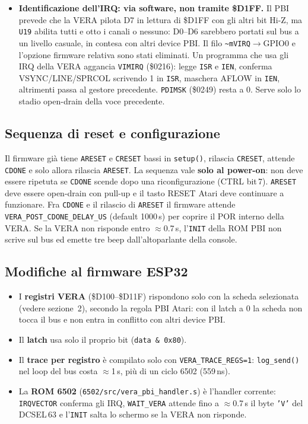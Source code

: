 \documentclass[12pt, a4paper]{article}
\begin{document}
\begin{itemize}
  \item \textbf{Identificazione dell'IRQ: via software, non tramite \$D1FF.} Il PBI prevede che la VERA pilota D7 in lettura di \$D1FF con gli altri bit Hi-Z, ma \texttt{U19} abilita tutti e otto i canali o nessuno: D0--D6 sarebbero portati sul bus a un livello casuale, in contesa con altri device PBI. Il filo \texttt{\textasciitilde mVIRQ}$\rightarrow$GPIO0 e l'opzione firmware relativa sono stati eliminati. Un programma che usa gli IRQ della VERA aggancia \texttt{VIMIRQ} (\$0216): legge \texttt{ISR} e \texttt{IEN}, conferma VSYNC/LINE/SPRCOL scrivendo 1 in \texttt{ISR}, maschera AFLOW in \texttt{IEN}, altrimenti passa al gestore precedente. \texttt{PDIMSK} (\$0249) resta a 0. Serve solo lo stadio open-drain della voce precedente.
\end{itemize}

\subsection*{Sequenza di reset e configurazione}
Il firmware già tiene \texttt{ARESET} e \texttt{CRESET} bassi in \texttt{setup()}, rilascia \texttt{CRESET}, attende \texttt{CDONE} e solo allora rilascia \texttt{ARESET}. La sequenza vale \textbf{solo al power-on}: non deve essere ripetuta se \texttt{CDONE} scende dopo una riconfigurazione (CTRL bit\,7). \texttt{ARESET} deve essere open-drain con pull-up e il tasto RESET Atari deve continuare a funzionare. Fra \texttt{CDONE} e il rilascio di \texttt{ARESET} il firmware attende \texttt{VERA\_POST\_CDONE\_DELAY\_US} (default 1000\,\textmu s) per coprire il POR interno della VERA. Se la VERA non risponde entro $\approx$0.7\,s, l'\texttt{INIT} della ROM PBI non scrive sul bus ed emette tre beep dall'altoparlante della console.

\subsection*{Modifiche al firmware ESP32}
\begin{itemize}
  \item I \textbf{registri VERA} (\$D100--\$D11F) rispondono solo con la scheda selezionata (vedere sezione~2), secondo la regola PBI Atari: con il latch a 0 la scheda non tocca il bus e non entra in conflitto con altri device PBI.
  \item Il \textbf{latch} usa solo il proprio bit (\texttt{data \& 0x80}).
  \item Il \textbf{trace per registro} è compilato solo con \texttt{VERA\_TRACE\_REGS=1}: \texttt{log\_send()} nel loop del bus costa $\approx$1\,\textmu s, più di un ciclo 6502 (559\,ns).
  \item La \textbf{ROM 6502} (\texttt{6502/src/vera\_pbi\_handler.s}) è l'handler corrente: \texttt{IRQVECTOR} conferma gli IRQ, \texttt{WAIT\_VERA} attende fino a $\approx$0.7\,s il byte \texttt{'V'} del DCSEL\,63 e l'\texttt{INIT} salta lo schermo se la VERA non risponde.
\end{itemize}
\end{document}
